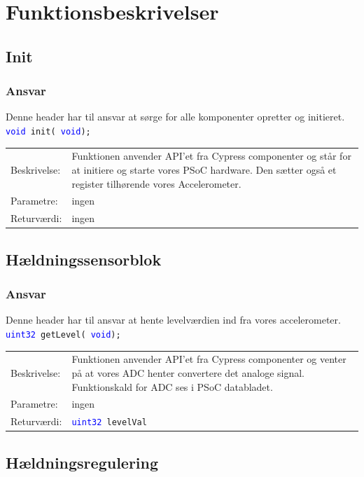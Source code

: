 \section{Funktionsbeskrivelser}
\subsection{Init}
\subsubsection{Ansvar}
Denne header har til ansvar at sørge for alle komponenter opretter og initieret.
\texttt{\textcolor{blue}{void} init( \textcolor{blue}{void});} 
\begin{table}[H]
\begin{tabular}{l p{12.5cm}}
\hline
Beskrivelse:& Funktionen anvender API'et fra Cypress componenter og står for at initiere og starte vores PSoC hardware. Den sætter også et register tilhørende vores Accelerometer. \\
Parametre:&ingen\\
Returværdi:&ingen\\
\end{tabular}
\end{table}
\subsection{Hældningssensorblok}
\subsubsection{Ansvar}
Denne header har til ansvar at hente levelværdien ind fra vores accelerometer.
\texttt{\textcolor{blue}{uint32} getLevel( \textcolor{blue}{void});} 
\begin{table}[H]
\begin{tabular}{l p{12.5cm}}
\hline
Beskrivelse:& Funktionen anvender API'et fra Cypress componenter og venter på at vores ADC henter convertere det analoge signal. Funktionskald for ADC ses i PSoC databladet. \\
Parametre:&ingen\\
Returværdi:&\texttt{\textcolor{blue}{uint32} levelVal}\\
\end{tabular}
\end{table}
\subsection{Hældningsregulering}
